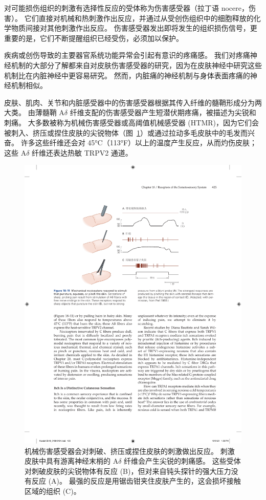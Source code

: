 对可能损伤组织的刺激有选择性反应的受体称为伤害感受器（拉丁语 nocere，伤害）。
它们直接对机械和热刺激作出反应，并通过从受创伤组织中的细胞释放的化学物质间接对其他刺激作出反应。
伤害感受器发出即将发生的组织损伤信号，更重要的是，它们不断提醒组织已经受伤，必须加以保护。


疾病或创伤导致的主要器官系统功能异常会引起有意识的疼痛感。
我们对疼痛神经机制的大部分了解都来自对皮肤伤害感受器的研究，因为在皮肤神经中研究这些机制比在内脏神经中更容易研究。
然而，内脏痛的神经机制与身体表面疼痛的神经机制相似。


皮肤、肌肉、关节和内脏感受器中的伤害感受器根据其传入纤维的髓鞘形成分为两大类。
由薄髓鞘 A$\delta$ 纤维支配的伤害感受器产生短潜伏期疼痛，被描述为尖锐和刺痛。
大多数被称为机械伤害感受器或高阈值机械感受器 (HTMR)，因为它们会被刺入、挤压或捏住皮肤的尖锐物体（图~\ref{fig:18_11}）或通过拉动多毛皮肤中的毛发而兴奋。
许多这些纤维还会对 45°C（113°F）以上的温度产生反应，从而灼伤皮肤；
这些 A$\delta$ 纤维还表达热敏 TRPV2 通道。


\begin{figure}[htbp]
	\centering
	\includegraphics[width=1.0\linewidth]{chap18/fig_18_11}
	\caption{机械伤害感受器会对刺破、挤压或捏住皮肤的刺激做出反应。
		刺激皮肤中具有游离神经末梢的 A$\delta$ 纤维会产生尖锐的刺痛感。
		这些受体对刺破皮肤的尖锐物体有反应 (B)，但对来自钝头探针的强大压力没有反应 (A)。
		最强的反应是用锯齿钳夹住皮肤产生的，这会损坏接触区域的组织 (C)\cite{perl1968myelinated}。}
	\label{fig:18_11}
\end{figure}


